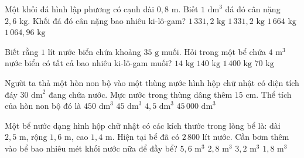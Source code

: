 \begin{ex} %
Một khối đá hình lập phương có cạnh dài $0{,}8\text{ m}$. Biết $1\text{ dm}^3$ đá đó cân nặng $2{,}6\text{ kg}$. Khối đá đó cân nặng bao nhiêu ki-lô-gam?
\choice
{$1\,331{,}2\text{ kg}$}
{\True $1\,331{,}2\text{ kg}$}
{$1\,664\text{ kg}$}
{$1\,064{,}96\text{ kg}$}
\end{ex}

\begin{ex} %
Biết rằng $1\text{ lít}$ nước biển chứa khoảng $35\text{ g}$ muối. Hỏi trong một bể chứa $4\text{ m}^3$ nước biển có tất cả bao nhiêu ki-lô-gam muối?
\choice
{$14\text{ kg}$}
{\True $140\text{ kg}$}
{$1\,400\text{ kg}$}
{$70\text{ kg}$}
\end{ex}

\begin{ex} %
Người ta thả một hòn non bộ vào một thùng nước hình hộp chữ nhật có diện tích đáy $30\text{ dm}^2$ đang chứa nước. Mực nước trong thùng dâng thêm $15\text{ cm}$. Thể tích của hòn non bộ đó là
\choice
{$450\text{ dm}^3$}
{\True $45\text{ dm}^3$}
{$4{,}5\text{ dm}^3$}
{$45\,000\text{ dm}^3$}
\end{ex}

\begin{ex} %
Một bể nước dạng hình hộp chữ nhật có các kích thước trong lòng bể là: dài $2{,}5\text{ m}$, rộng $1{,}6\text{ m}$, cao $1{,}4\text{ m}$. Hiện tại bể đã có $2\,800\text{ lít}$ nước. Cần bơm thêm vào bể bao nhiêu mét khối nước nữa để đầy bể?
\choice
{$5{,}6\text{ m}^3$}
{\True $2{,}8\text{ m}^3$}
{$3{,}2\text{ m}^3$}
{$1{,}8\text{ m}^3$}
\end{ex}

